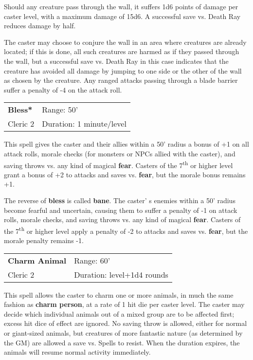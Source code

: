 \documentclass[a4paper,twoside,openany,10pt]{book}
\begin{document}
\begin{multicols}{2}
Should any creature pass through the wall, it suffers 1d6 points of damage per caster level, with a maximum damage of 15d6. A successful save vs. Death Ray reduces damage by half.

The caster may choose to conjure the wall in an area where creatures are already located; if this is done, all such creatures are harmed as if they passed through the wall, but a successful save vs. Death Ray in this case indicates that the creature has avoided all damage by jumping to one side or the other of the wall as chosen by the creature.  Any ranged attacks passing through a blade barrier suffer a penalty of -4 on the attack roll.

\smallskip\begin{flushleft} 
	\begin{tabularx}{0.45\textwidth}{@{}m{3.5cm}m{5.5cm}@{}} 
		\textbf{Bless*} & Range: 50'\\
		Cleric 2 & Duration: 1 minute/level\\	
	\end{tabularx}\end{flushleft}


This spell gives the caster and their allies within a 50'{} radius a bonus of +1 on all attack rolls, morale checks (for monsters or NPCs allied with the caster), and saving throws vs. any kind of magical \textbf{fear}. Casters of the 7\textsuperscript{th} or higher level grant a bonus of +2 to attacks and saves vs. \textbf{fear}, but the morale bonus remains +1.

The reverse of \textbf{bless }is called \textbf{bane}. The caster' s enemies within a 50'{} radius become fearful and uncertain, causing them to suffer a penalty of -1 on attack rolls, morale checks, and saving throws vs. any kind of magical \textbf{fear}. Casters of the 7\textsuperscript{th} or higher level apply a penalty of -2 to attacks and saves vs. \textbf{fear}, but the morale penalty remains -1.

\smallskip\begin{flushleft} 
	\begin{tabularx}{0.45\textwidth}{@{}m{3.5cm}m{5.5cm}@{}} 
		\textbf{Charm Animal} & Range: 60'\\
		Cleric 2 & Duration: level+1d4 rounds\\	
	\end{tabularx}\end{flushleft}

This spell allows the caster to charm one or more animals, in much the same fashion as \textbf{charm person}, at a rate of 1 hit die per caster level. The caster may decide which individual animals out of a mixed group are to be affected first; excess hit dice of effect are ignored. No saving throw is allowed, either for normal or giant-sized animals, but creatures of more fantastic nature (as determined by the GM) are allowed a save vs. Spells to resist. When the duration expires, the animals will resume normal activity immediately.


\end{multicols}
\end{document}
